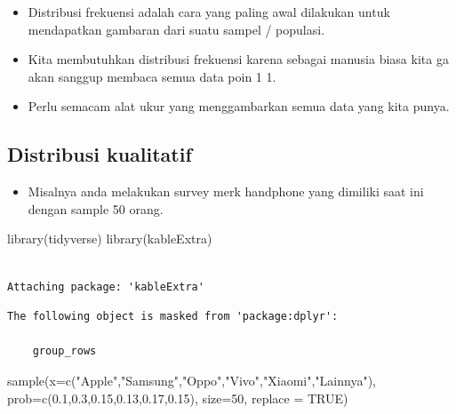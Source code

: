 \documentclass[
  letterpaper,
  DIV=11,
  numbers=noendperiod]{scrartcl}
\newenvironment{Shaded}{\begin{snugshade}}{\end{snugshade}}
\newcommand{\AttributeTok}[1]{\textcolor[rgb]{0.40,0.45,0.13}{#1}}
\newcommand{\ConstantTok}[1]{\textcolor[rgb]{0.56,0.35,0.01}{#1}}
\newcommand{\DecValTok}[1]{\textcolor[rgb]{0.68,0.00,0.00}{#1}}
\newcommand{\FloatTok}[1]{\textcolor[rgb]{0.68,0.00,0.00}{#1}}
\newcommand{\FunctionTok}[1]{\textcolor[rgb]{0.28,0.35,0.67}{#1}}
\newcommand{\NormalTok}[1]{\textcolor[rgb]{0.00,0.23,0.31}{#1}}
\newcommand{\StringTok}[1]{\textcolor[rgb]{0.13,0.47,0.30}{#1}}
\providecommand{\tightlist}{%
  \setlength{\itemsep}{0pt}\setlength{\parskip}{0pt}}\usepackage{longtable,booktabs,array}
\begin{document}
\begin{itemize}
\item
  Distribusi frekuensi adalah cara yang paling awal dilakukan untuk
  mendapatkan gambaran dari suatu sampel / populasi.
\item
  Kita membutuhkan distribusi frekuensi karena sebagai manusia biasa
  kita ga akan sanggup membaca semua data poin 1 1.
\item
  Perlu semacam alat ukur yang menggambarkan semua data yang kita punya.
\end{itemize}

\hypertarget{distribusi-kualitatif}{%
\subsection{Distribusi kualitatif}\label{distribusi-kualitatif}}

\begin{itemize}
\tightlist
\item
  Misalnya anda melakukan survey merk handphone yang dimiliki saat ini
  dengan sample 50 orang.
\end{itemize}

\begin{Shaded}
\begin{Highlighting}[]
\FunctionTok{library}\NormalTok{(tidyverse)}
\FunctionTok{library}\NormalTok{(kableExtra)}
\end{Highlighting}
\end{Shaded}

\begin{verbatim}

Attaching package: 'kableExtra'
\end{verbatim}

\begin{verbatim}
The following object is masked from 'package:dplyr':

    group_rows
\end{verbatim}

\begin{Shaded}
\begin{Highlighting}[]
\FunctionTok{sample}\NormalTok{(}\AttributeTok{x=}\FunctionTok{c}\NormalTok{(}\StringTok{"Apple"}\NormalTok{,}\StringTok{"Samsung"}\NormalTok{,}\StringTok{"Oppo"}\NormalTok{,}\StringTok{"Vivo"}\NormalTok{,}\StringTok{"Xiaomi"}\NormalTok{,}\StringTok{"Lainnya"}\NormalTok{),}
                      \AttributeTok{prob=}\FunctionTok{c}\NormalTok{(}\FloatTok{0.1}\NormalTok{,}\FloatTok{0.3}\NormalTok{,}\FloatTok{0.15}\NormalTok{,}\FloatTok{0.13}\NormalTok{,}\FloatTok{0.17}\NormalTok{,}\FloatTok{0.15}\NormalTok{),}
                      \AttributeTok{size=}\DecValTok{50}\NormalTok{,}
                      \AttributeTok{replace =} \ConstantTok{TRUE}\NormalTok{)}
\end{Highlighting}
\end{Shaded}
\end{document}
